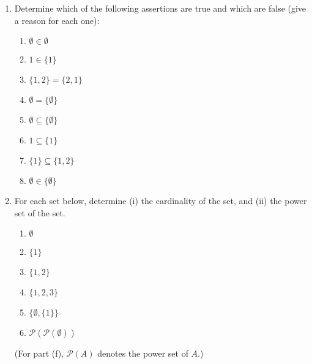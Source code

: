 \documentclass[letterpaper,12pt]{article}
\begin{document}
\begin{enumerate}
\item Determine which of the following assertions are true and which are false (give a reason for each one):
\begin{multicols}{2}
\begin{enumerate}
 \item $\emptyset\in \emptyset$
 \item $1\in\{1\}$
 \item $\{1,2\}=\{2,1\}$
 \item $\emptyset=\{\emptyset\}$
 \item $\emptyset\subseteq \{\emptyset\}$
 \item $1\subseteq \{1\}$
 \item $\{1\}\subseteq \{1,2\}$
 \item $\emptyset\in\{\emptyset\}$
\end{enumerate}
\end{multicols}
\item For each set below, determine (i) the cardinality of the set, and (ii) the power set of the set.
\begin{multicols}{3}
\begin{enumerate}
\item $\emptyset$
\item $\{1\}$
\item $\{1,2\}$
\item $\{1,2,3\}$
\item $\{\emptyset,\{1\}\}$
\item $\mathcal{P}(\mathcal{P}(\emptyset))$
\end{enumerate}
\end{multicols}
(For part (f), $\mathcal{P}(A)$ denotes the power set of $A$.)


\end{enumerate}
\end{document}
